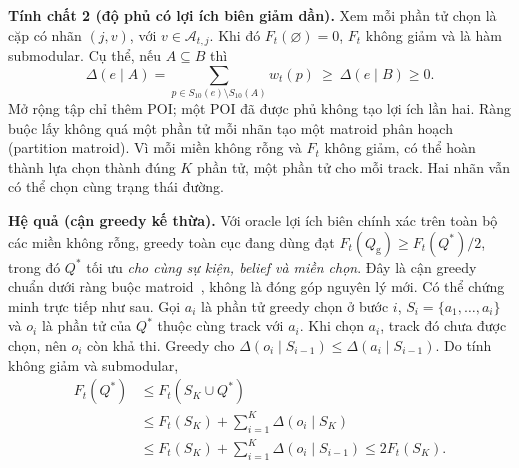 \noindent\textbf{Tính chất 2 (độ phủ có lợi ích biên giảm dần).}
Xem mỗi phần tử chọn là cặp có nhãn $(j,v)$, với
$v\in\mathcal A_{t,j}$. Khi đó $F_t(\varnothing)=0$, $F_t$ không giảm
và là hàm submodular. Cụ thể, nếu $A\subseteq B$ thì
\[
 \Delta(e\mid A)=\sum_{p\in S_{10}(e)\setminus S_{10}(A)}w_t(p)
 \ \geq\
 \Delta(e\mid B)\geq0.
\]
Mở rộng tập chỉ thêm POI; một POI đã được phủ không tạo lợi ích lần hai.
Ràng buộc lấy không quá một phần tử mỗi nhãn tạo một matroid phân hoạch
(partition matroid). Vì mỗi miền không rỗng và $F_t$ không giảm, có thể hoàn
thành lựa chọn thành đúng $K$ phần tử, một phần tử cho mỗi track. Hai nhãn
vẫn có thể chọn cùng trạng thái đường.

\noindent\textbf{Hệ quả (cận greedy kế thừa).}
Với oracle lợi ích biên chính xác trên toàn bộ các miền không rỗng,
greedy toàn cục đang dùng đạt $F_t(Q_{\mathrm g})\geq F_t(Q^*)/2$, trong
đó $Q^*$ tối ưu \emph{cho cùng sự kiện, belief và miền chọn}.
Đây là cận greedy chuẩn dưới ràng buộc matroid~\cite{calinescu2011matroid}, không là đóng góp
nguyên lý mới. Có thể chứng minh trực tiếp như sau. Gọi $a_i$ là phần tử
greedy chọn ở bước $i$, $S_i=\{a_1,\ldots,a_i\}$ và $o_i$ là phần tử
của $Q^*$ thuộc cùng track với $a_i$. Khi chọn $a_i$, track đó chưa được
chọn, nên $o_i$ còn khả thi. Greedy cho
$\Delta(o_i\mid S_{i-1})\leq\Delta(a_i\mid S_{i-1})$. Do tính không
giảm và submodular,
\begin{equation}
 \begin{split}
 F_t(Q^*)&\leq F_t(S_K\cup Q^*)\\
 &\leq F_t(S_K)+\sum_{i=1}^K\Delta(o_i\mid S_K)\\
 &\leq F_t(S_K)+\sum_{i=1}^K\Delta(o_i\mid S_{i-1})
 \leq2F_t(S_K).
 \end{split}
 \label{eq:formal-service-greedy-half}
\end{equation}

